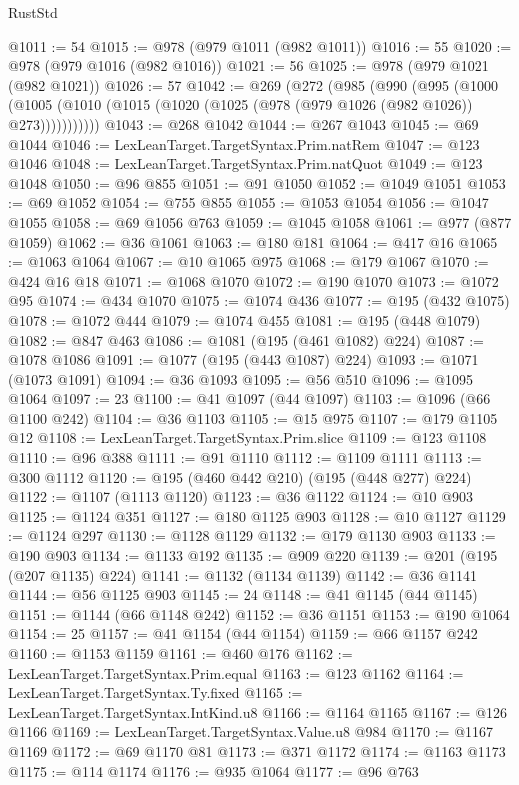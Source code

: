 \begin{lexlean}{RustStd}
\begin{coremodule}
@1011 := 54
@1015 := @978 (@979 @1011 (@982 @1011))
@1016 := 55
@1020 := @978 (@979 @1016 (@982 @1016))
@1021 := 56
@1025 := @978 (@979 @1021 (@982 @1021))
@1026 := 57
@1042 := @269
    (@272
      (@985
        (@990
          (@995
            (@1000
              (@1005 (@1010 (@1015 (@1020 (@1025 (@978 (@979 @1026 (@982 @1026)) @273)))))))))))
@1043 := @268 @1042
@1044 := @267 @1043
@1045 := @69 @1044
@1046 := LexLeanTarget.TargetSyntax.Prim.natRem
@1047 := @123 @1046
@1048 := LexLeanTarget.TargetSyntax.Prim.natQuot
@1049 := @123 @1048
@1050 := @96 @855
@1051 := @91 @1050
@1052 := @1049 @1051
@1053 := @69 @1052
@1054 := @755 @855
@1055 := @1053 @1054
@1056 := @1047 @1055
@1058 := @69 @1056 @763
@1059 := @1045 @1058
@1061 := @977 (@877 @1059)
@1062 := @36 @1061
@1063 := @180 @181
@1064 := @417 @16
@1065 := @1063 @1064
@1067 := @10 @1065 @975
@1068 := @179 @1067
@1070 := @424 @16 @18
@1071 := @1068 @1070
@1072 := @190 @1070
@1073 := @1072 @95
@1074 := @434 @1070
@1075 := @1074 @436
@1077 := @195 (@432 @1075)
@1078 := @1072 @444
@1079 := @1074 @455
@1081 := @195 (@448 @1079)
@1082 := @847 @463
@1086 := @1081 (@195 (@461 @1082) @224)
@1087 := @1078 @1086
@1091 := @1077 (@195 (@443 @1087) @224)
@1093 := @1071 (@1073 @1091)
@1094 := @36 @1093
@1095 := @56 @510
@1096 := @1095 @1064
@1097 := 23
@1100 := @41 @1097 (@44 @1097)
@1103 := @1096 (@66 @1100 @242)
@1104 := @36 @1103
@1105 := @15 @975
@1107 := @179 @1105 @12
@1108 := LexLeanTarget.TargetSyntax.Prim.slice
@1109 := @123 @1108
@1110 := @96 @388
@1111 := @91 @1110
@1112 := @1109 @1111
@1113 := @300 @1112
@1120 := @195 (@460 @442 @210) (@195 (@448 @277) @224)
@1122 := @1107 (@1113 @1120)
@1123 := @36 @1122
@1124 := @10 @903
@1125 := @1124 @351
@1127 := @180 @1125 @903
@1128 := @10 @1127
@1129 := @1124 @297
@1130 := @1128 @1129
@1132 := @179 @1130 @903
@1133 := @190 @903
@1134 := @1133 @192
@1135 := @909 @220
@1139 := @201 (@195 (@207 @1135) @224)
@1141 := @1132 (@1134 @1139)
@1142 := @36 @1141
@1144 := @56 @1125 @903
@1145 := 24
@1148 := @41 @1145 (@44 @1145)
@1151 := @1144 (@66 @1148 @242)
@1152 := @36 @1151
@1153 := @190 @1064
@1154 := 25
@1157 := @41 @1154 (@44 @1154)
@1159 := @66 @1157 @242
@1160 := @1153 @1159
@1161 := @460 @176
@1162 := LexLeanTarget.TargetSyntax.Prim.equal
@1163 := @123 @1162
@1164 := LexLeanTarget.TargetSyntax.Ty.fixed
@1165 := LexLeanTarget.TargetSyntax.IntKind.u8
@1166 := @1164 @1165
@1167 := @126 @1166
@1169 := LexLeanTarget.TargetSyntax.Value.u8 @984
@1170 := @1167 @1169
@1172 := @69 @1170 @81
@1173 := @371 @1172
@1174 := @1163 @1173
@1175 := @114 @1174
@1176 := @935 @1064
@1177 := @96 @763

\end{coremodule}
\end{lexlean}
